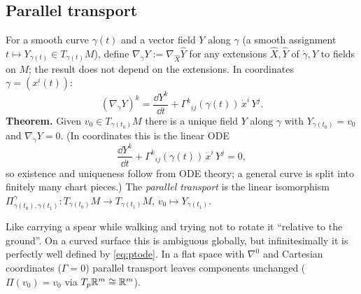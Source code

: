 \subsection{Parallel transport}
\begin{formal}
For a smooth curve $\gamma(t)$ and a vector field $Y$ along $\gamma$ (a smooth assignment $t\mapsto Y_{\gamma(t)}\in T_{\gamma(t)}M$), define $\nabla_{\dot\gamma}Y:=\nabla_{\hat X}\hat Y$ for any extensions $\hat X,\hat Y$ of $\dot\gamma, Y$ to fields on $M$; the result does not depend on the extensions. In coordinates $\gamma=(x^i(t))$:
\[
(\nabla_{\dot\gamma}Y)^k=\frac{\dd Y^k}{\dd t}+\Gamma^k{}_{ij}(\gamma(t))\,\dot x^i\,Y^j .
\]
\textbf{Theorem.} Given $v_0\in T_{\gamma(t_0)}M$ there is a unique field $Y$ along $\gamma$ with $Y_{\gamma(t_0)}=v_0$ and $\nabla_{\dot\gamma}Y=0$. (In coordinates this is the linear ODE
\begin{equation}\label{eq:ptode}
\frac{\dd Y^k}{\dd t}+\Gamma^k{}_{ij}(\gamma(t))\,\dot x^i\,Y^j=0,
\end{equation}
so existence and uniqueness follow from ODE theory; a general curve is split into finitely many chart pieces.) The \emph{parallel transport} is the linear isomorphism $\Pi^\gamma_{\gamma(t_0),\gamma(t_1)}:T_{\gamma(t_0)}M\to T_{\gamma(t_1)}M$, $v_0\mapsto Y_{\gamma(t_1)}$.
\end{formal}
\begin{intuition}
Like carrying a spear while walking and trying not to rotate it ``relative to the ground''. On a curved surface this is ambiguous globally, but infinitesimally it is perfectly well defined by \eqref{eq:ptode}. In a flat space with $\nabla^0$ and Cartesian coordinates ($\Gamma=0$) parallel transport leaves components unchanged ($\Pi(v_0)=v_0$ via $T_p\mathbb{R}^m\cong\mathbb{R}^m$).
\end{intuition}

